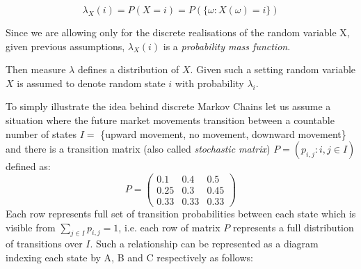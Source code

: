 \begin{equation}
\lambda_X(i) = P(X=i)=P(\{\omega: X(\omega)=i\})
\end{equation}

Since we are allowing only for the discrete realisations of the random variable X, given previous assumptions, $\lambda_X(i)$ is a {\it probability mass function}.

Then measure $\lambda$ defines a distribution of $X$. Given such a setting random variable $X$ is assumed to denote random state $i$ with probability $\lambda_i$. 

To simply illustrate the idea behind discrete Markov Chains let us assume a situation where the future market movements transition between a countable number of states $I =$ \{upward movement, no movement, downward movement\} and there is a transition matrix (also called {\it stochastic matrix}) $P = (p_{i,j} : i,j \in I)$ defined as:
\begin{equation*}
P =
\begin{pmatrix}
0.1 & 0.4 & 0.5 \\
0.25 & 0.3 & 0.45 \\
0.33 & 0.33 & 0.33 
\end{pmatrix}
\end{equation*}
Each row represents full set of transition probabilities between each state which is visible from $\sum_{j \in I} ^{}p_{i,j} = 1 $, i.e. each row of matrix $P$ represents a full distribution of transitions over $I$. Such a relationship can be represented as a diagram indexing each state by A, B and C respectively as follows:

\begin{center}
\end{center}
 
